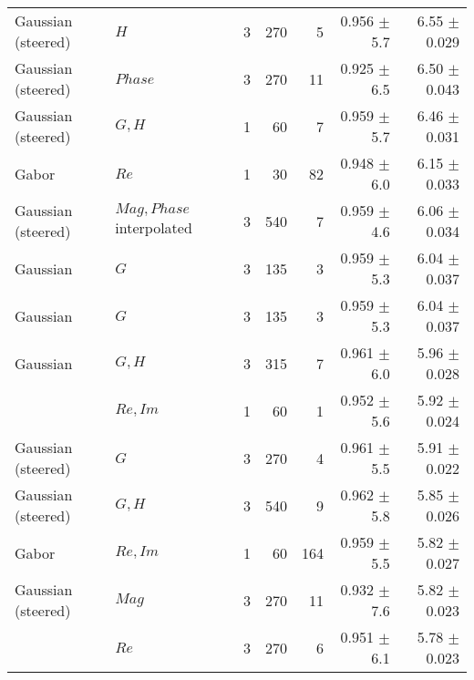 \begin{tabularx}{\linewidth}{p{3cm} p{3cm} r r r r r}
Gaussian (steered)& $H$             & 3 &    270    &  5     & 0.956 $\pm$ 5.7  & 6.55 $\pm$ 0.029 \\

Gaussian (steered)& $Phase$         & 3 &    270    & 11     & 0.925 $\pm$ 6.5  & 6.50 $\pm$ 0.043 \\

Gaussian (steered)& $G,H$           & 1 &     60    &  7     & 0.959 $\pm$ 5.7  & 6.46 $\pm$ 0.031 \\

Gabor   & $Re$                      & 1 &     30    & 82     & 0.948 $\pm$ 6.0  & 6.15 $\pm$ 0.033 \\

Gaussian (steered)& $Mag, Phase$ interpolated
                                    & 3 &    540    &  7     & 0.959 $\pm$ 4.6  & 6.06 $\pm$ 0.034 \\

Gaussian& $G$                       & 3 &    135    &  3     & 0.959 $\pm$ 5.3  & 6.04 $\pm$ 0.037 \\

Gaussian& $G$                       & 3 &    135    &  3     & 0.959 $\pm$ 5.3  & 6.04 $\pm$ 0.037 \\

Gaussian& $G, H$                    & 3 &    315    &  7     & 0.961 $\pm$ 6.0  & 5.96 $\pm$ 0.028 \\

\dtcwt{}& $Re,Im$                   & 1 &     60    &  1     & 0.952 $\pm$ 5.6  & 5.92 $\pm$ 0.024 \\

Gaussian (steered)& $G$             & 3 &    270    &  4     & 0.961 $\pm$ 5.5  & 5.91 $\pm$ 0.022 \\

Gaussian (steered)& $G,H$           & 3 &    540    &  9     & 0.962 $\pm$ 5.8  & 5.85 $\pm$ 0.026 \\

Gabor   & $Re,Im$                   & 1 &     60    &164     & 0.959 $\pm$ 5.5  & 5.82 $\pm$ 0.027 \\

Gaussian (steered)& $Mag$           & 3 &    270    & 11     & 0.932 $\pm$ 7.6  & 5.82 $\pm$ 0.023 \\

\dtcwt{}& $Re$                      & 3 &    270    &  6     & 0.951 $\pm$ 6.1  & 5.78 $\pm$ 0.023 \\


\end{tabularx}
